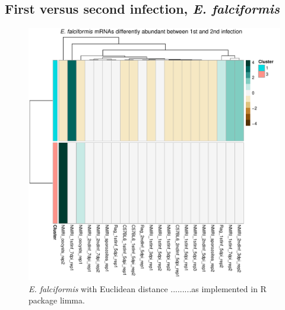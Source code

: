 \documentclass{article}
\begin{document}
\subsection{First versus second infection, \textit{E. falciformis}}
\begin{figure}[H]
\begin{center}
\includegraphics[width=\textwidth]{Ef1st2ndHeatmap.pdf}  
	\caption{\textit{E. falciformis} with Euclidean distance .........as implemented in R package limma.}
\end{center}
\end{figure}
\end{document}
